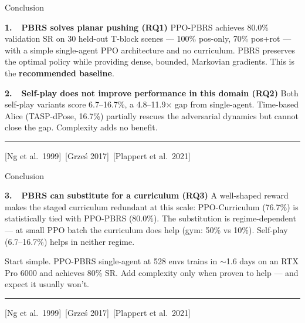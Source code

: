 \documentclass[aspectratio=169,xcolor=dvipsnames,t]{beamer}
\newcommand{\litfooter}[1]{%
  \vspace{2pt}%
  \hrule%
  \vspace{2pt}%
  {\tiny\color{LightDarkGrey} #1}%
}
\begin{document}
\begin{frame}[t]{Conclusion}
  \begin{block}{\textbf{1.\ \ PBRS solves planar pushing (RQ1)}}
    PPO-PBRS achieves \textcolor{hlgreen}{80.0\% validation SR} on 30 held-out T-block scenes — 100\% pos-only, 70\% pos+rot — with a simple single-agent PPO architecture and no curriculum. PBRS preserves the optimal policy while providing dense, bounded, Markovian gradients. This is the \textbf{recommended baseline}.
  \end{block}

  \vspace{1pt}
  \begin{block}{\textbf{2.\ \ Self-play does not improve performance in this domain (RQ2)}}
    Both self-play variants score 6.7--16.7\%, a 4.8--11.9$\times$ gap from single-agent. Time-based Alice (TASP-dPose, 16.7\%) partially rescues the adversarial dynamics but cannot close the gap. Complexity adds no benefit.
  \end{block}

  \vfill\litfooter{[Ng et al.\ 1999]~[Grze\'s 2017]~[Plappert et al.\ 2021]}
\end{frame}

\begin{frame}[t]{Conclusion}
  \begin{block}{\textbf{3.\ \ PBRS can substitute for a curriculum (RQ3)}}
    A well-shaped reward makes the staged curriculum redundant at this scale: PPO-Curriculum (76.7\%) is statistically tied with PPO-PBRS (80.0\%). The substitution is regime-dependent — at small PPO batch the curriculum does help (gym: 50\% vs 10\%). Self-play (6.7--16.7\%) helps in neither regime.
  \end{block}

  \vspace{1pt}
  {\small Start simple. PPO-PBRS single-agent at 528 envs trains in $\sim$1.6 days on an RTX Pro 6000 and achieves 80\% SR. Add complexity only when proven to help — and expect it usually won't.}

  \vfill\litfooter{[Ng et al.\ 1999]~[Grze\'s 2017]~[Plappert et al.\ 2021]}
\end{frame}
\end{document}
